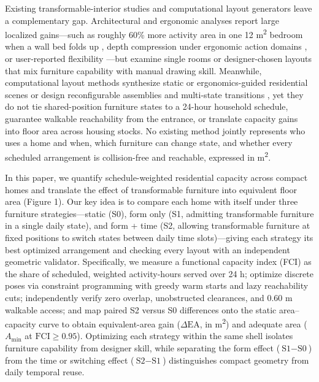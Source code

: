 \documentclass[12pt,letterpaper]{article}
\newcommand{\SubmissionCite}[1]{\unskip\citep{#1}}
\begin{document}
Existing transformable-interior studies and computational layout generators leave a complementary gap. Architectural and ergonomic analyses report large localized gains---such as roughly 60\% more activity area in one 12 m\textsuperscript{2} bedroom when a wall bed folds up \SubmissionCite{bu2026compact}, depth compression under ergonomic action domains \SubmissionCite{zeng2026sbf}, or user-reported flexibility \SubmissionCite{ashkevari2023flexibility,daglio2023housing}---but examine single rooms or designer-chosen layouts that mix furniture capability with manual drawing skill. Meanwhile, computational layout methods synthesize static or ergonomics-guided residential scenes \SubmissionCite{merrell2011furniture,yu2011makeithome,sun2025layoutvlm,li2026homeworld,nieciecki2026comfortable,xiang2026colayout} or design reconfigurable assemblies and multi-state transitions \SubmissionCite{garg2016reconfigurables,xiong2021motion,fu2024magic,liu2025diff,zhang2025sceneexplorer,xiong2026mafc}, yet they do not tie shared-position furniture states to a 24-hour household schedule, guarantee walkable reachability from the entrance, or translate capacity gains into floor area across housing stocks. No existing method jointly represents who uses a home and when, which furniture can change state, and whether every scheduled arrangement is collision-free and reachable, expressed in m\textsuperscript{2}.

In this paper, we quantify schedule-weighted residential capacity across compact homes and translate the effect of transformable furniture into equivalent floor area (Figure 1). Our key idea is to compare each home with itself under three furniture strategies---static (S0), form only (S1, admitting transformable furniture in a single daily state), and form + time (S2, allowing transformable furniture at fixed positions to switch states between daily time slots)---giving each strategy its best optimized arrangement and checking every layout with an independent geometric validator. Specifically, we measure a functional capacity index (FCI) as the share of scheduled, weighted activity-hours served over 24 h; optimize discrete poses via constraint programming with greedy warm starts and lazy reachability cuts; independently verify zero overlap, unobstructed clearances, and 0.60 m walkable access; and map paired S2 versus S0 differences onto the static area--capacity curve to obtain equivalent-area gain (\(\Delta\text{EA}\), in m\textsuperscript{2}) and adequate area (\(A_{\min}\) at \(\text{FCI} \ge 0.95\)). Optimizing each strategy within the same shell isolates furniture capability from designer skill, while separating the form effect (\(\text{S1} - \text{S0}\)) from the time or switching effect (\(\text{S2} - \text{S1}\)) distinguishes compact geometry from daily temporal reuse.
\end{document}
